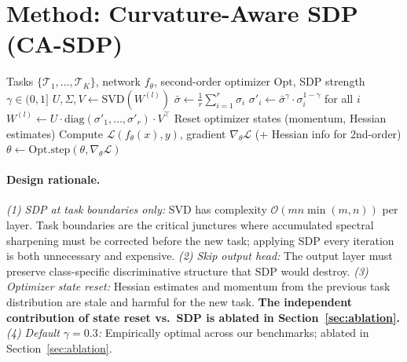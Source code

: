 \documentclass{article}
\newcommand{\diag}{\mathrm{diag}}
\newcommand{\cL}{\mathcal{L}}
\newcommand{\cT}{\mathcal{T}}
\newcommand{\cO}{\mathcal{O}}
\begin{document}
\section{Method: Curvature-Aware SDP (CA-SDP)}
\label{sec:method}

\begin{algorithm}[t]
\caption{Continual Learning with Second-Order Optimizer + SDP (CA-SDP)}
\label{alg:casdp}
\begin{algorithmic}[1]
\REQUIRE Tasks $\{\cT_1, \ldots, \cT_K\}$, network $f_\theta$, second-order optimizer $\mathrm{Opt}$, SDP strength $\gamma \in (0,1]$
     
            \STATE $U, \Sigma, V \leftarrow \text{SVD}(W^{(l)})$ 
            \STATE $\bar{\sigma} \leftarrow \frac{1}{r}\sum_{i=1}^r \sigma_i$
            \STATE $\sigma'_i \leftarrow \bar{\sigma}^\gamma \cdot \sigma_i^{1-\gamma}$ for all $i$
            \STATE $W^{(l)} \leftarrow U \cdot \diag(\sigma'_1, \ldots, \sigma'_r) \cdot V^\top$
        \ENDFOR
        \STATE Reset optimizer states (momentum, Hessian estimates) 
    \ENDIF
    \FOR{each epoch in task $\cT_k$}
            \STATE Compute $\cL(f_\theta(x), y)$, gradient $\nabla_\theta \cL$ (+ Hessian info for 2nd-order)
            \STATE $\theta \leftarrow \mathrm{Opt}.\text{step}(\theta, \nabla_\theta \cL)$
        \ENDFOR
    \ENDFOR
\ENDFOR
\end{algorithmic}
\end{algorithm}

\paragraph{Design rationale.}
\emph{(1) SDP at task boundaries only:} SVD has complexity $\cO(mn\min(m,n))$ per layer. Task boundaries are the critical junctures where accumulated spectral sharpening must be corrected before the new task; applying SDP every iteration is both unnecessary and expensive.
\emph{(2) Skip output head:} The output layer must preserve class-specific discriminative structure that SDP would destroy.
\emph{(3) Optimizer state reset:} Hessian estimates and momentum from the previous task distribution are stale and harmful for the new task. \textbf{The independent contribution of state reset vs.\ SDP is ablated in Section~\ref{sec:ablation}.}
\emph{(4) Default $\gamma = 0.3$:} Empirically optimal across our benchmarks; ablated in Section~\ref{sec:ablation}.
\end{document}
